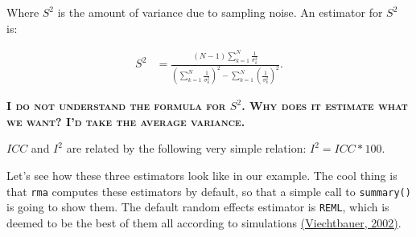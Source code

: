 \documentclass[]{book}
\newenvironment{Shaded}{\begin{snugshade}}{\end{snugshade}}
\newcommand{\KeywordTok}[1]{\textcolor[rgb]{0.13,0.29,0.53}{\textbf{#1}}}
\newcommand{\DataTypeTok}[1]{\textcolor[rgb]{0.13,0.29,0.53}{#1}}
\newcommand{\DecValTok}[1]{\textcolor[rgb]{0.00,0.00,0.81}{#1}}
\newcommand{\StringTok}[1]{\textcolor[rgb]{0.31,0.60,0.02}{#1}}
\newcommand{\CommentTok}[1]{\textcolor[rgb]{0.56,0.35,0.01}{\textit{#1}}}
\newcommand{\OperatorTok}[1]{\textcolor[rgb]{0.81,0.36,0.00}{\textbf{#1}}}
\newcommand{\NormalTok}[1]{#1}
\theoremstyle{definition}
\theoremstyle{definition}
\theoremstyle{definition}
\theoremstyle{remark}
\let\BeginKnitrBlock\begin \let\EndKnitrBlock\end
\begin{document}
Where \(S^2\) is the amount of variance due to sampling noise. An
estimator for \(S^2\) is:

\begin{align*}
  S^2 & = \frac{(N-1)\sum_{k=1}^N\frac{1}{\sigma^2_k}}{(\sum_{k=1}^N\frac{1}{\sigma^2_k})^2-\sum_{k=1}^N(\frac{1}{\sigma^2_k})^2}.
\end{align*}

\textbf{\textsc{I do not understand the formula for \(S^2\). Why does it
estimate what we want? I'd take the average variance.}}

\(ICC\) and \(I^2\) are related by the following very simple relation:
\(I^2=ICC*100\).

\BeginKnitrBlock{example}
\protect\hypertarget{exm:unnamed-chunk-156}{}{\label{exm:unnamed-chunk-156}
}Let's see how these three estimators look like in our example. The cool
thing is that \texttt{rma} computes these estimators by default, so that
a simple call to \texttt{summary()} is going to show them. The default
random effects estimator is \texttt{REML}, which is deemed to be the
best of them all according to simulations
\href{https://journals.sagepub.com/doi/abs/10.3102/10769986030003261}{(Viechtbauer,
2002)}.
\EndKnitrBlock{example}

\begin{Shaded}
\end{Shaded}
\end{document}
